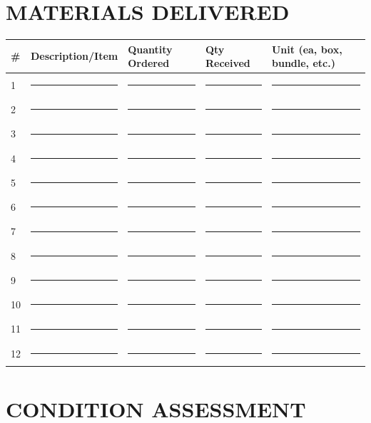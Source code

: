 \documentclass[11pt,letterpaper]{article}
\begin{document}
\vspace{6pt}

\section*{MATERIALS DELIVERED}

\begin{longtable}{|p{0.4in}|p{2.5in}|p{0.8in}|p{0.6in}|p{1.5in}|}
\hline
\textbf{\#} & \textbf{Description/Item} & \textbf{Quantity Ordered} & \textbf{Qty Received} & \textbf{Unit (ea, box, bundle, etc.)} \\
\hline
1 & \rule{2.3in}{0.4pt} & \rule{0.6in}{0.4pt} & \rule{0.4in}{0.4pt} & \rule{1.2in}{0.4pt} \\
\hline
2 & \rule{2.3in}{0.4pt} & \rule{0.6in}{0.4pt} & \rule{0.4in}{0.4pt} & \rule{1.2in}{0.4pt} \\
\hline
3 & \rule{2.3in}{0.4pt} & \rule{0.6in}{0.4pt} & \rule{0.4in}{0.4pt} & \rule{1.2in}{0.4pt} \\
\hline
4 & \rule{2.3in}{0.4pt} & \rule{0.6in}{0.4pt} & \rule{0.4in}{0.4pt} & \rule{1.2in}{0.4pt} \\
\hline
5 & \rule{2.3in}{0.4pt} & \rule{0.6in}{0.4pt} & \rule{0.4in}{0.4pt} & \rule{1.2in}{0.4pt} \\
\hline
6 & \rule{2.3in}{0.4pt} & \rule{0.6in}{0.4pt} & \rule{0.4in}{0.4pt} & \rule{1.2in}{0.4pt} \\
\hline
7 & \rule{2.3in}{0.4pt} & \rule{0.6in}{0.4pt} & \rule{0.4in}{0.4pt} & \rule{1.2in}{0.4pt} \\
\hline
8 & \rule{2.3in}{0.4pt} & \rule{0.6in}{0.4pt} & \rule{0.4in}{0.4pt} & \rule{1.2in}{0.4pt} \\
\hline
9 & \rule{2.3in}{0.4pt} & \rule{0.6in}{0.4pt} & \rule{0.4in}{0.4pt} & \rule{1.2in}{0.4pt} \\
\hline
10 & \rule{2.3in}{0.4pt} & \rule{0.6in}{0.4pt} & \rule{0.4in}{0.4pt} & \rule{1.2in}{0.4pt} \\
\hline
11 & \rule{2.3in}{0.4pt} & \rule{0.6in}{0.4pt} & \rule{0.4in}{0.4pt} & \rule{1.2in}{0.4pt} \\
\hline
12 & \rule{2.3in}{0.4pt} & \rule{0.6in}{0.4pt} & \rule{0.4in}{0.4pt} & \rule{1.2in}{0.4pt} \\
\hline
\end{longtable}

\newpage

\section*{CONDITION ASSESSMENT}
\end{document}
